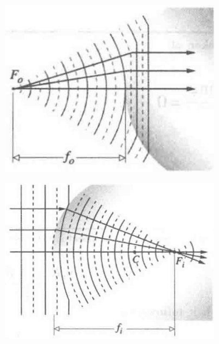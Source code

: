 \begin{figure}[H]
  \centering
  \begin{subfigure}{.3\textwidth}
    \centering
    \includegraphics[width=\linewidth]{figures/Refraction at a Spherical Interface 1.jpg}
    \label{fig:}
  \end{subfigure}
  \hspace{2cm}
  \begin{subfigure}{.4\textwidth}
    \centering
    \includegraphics[width=\linewidth]{figures/Refraction at a Spherical Interface 2.jpg}
    \label{fig:}
  \end{subfigure}
  \label{fig:}
\end{figure}



